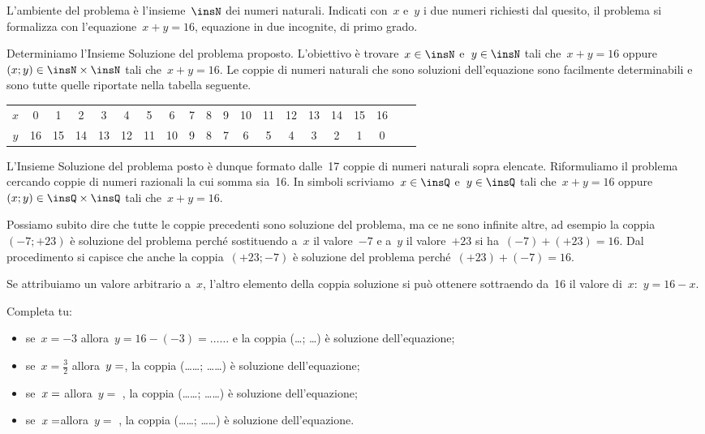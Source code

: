 \begin{soluzione}
L'ambiente del problema è l'insieme~$\insN$ dei numeri naturali. Indicati 
con~$x$ e~$y$ i due numeri
richiesti dal quesito, il problema si formalizza con l'equazione~$x+y=16$, 
equazione in due incognite, di
primo grado.

Determiniamo l'Insieme Soluzione del problema proposto.
L'obiettivo è trovare~$x\in\insN$ e~$y\in\insN$ tali che~$x+y=16$ 
oppure~$(x;y)\in\insN\times\insN$ tali che~$x+y=16$.
Le coppie di numeri naturali che sono soluzioni
dell'equazione sono facilmente determinabili e sono
tutte quelle riportate nella tabella seguente.

\begin{tabular}{cccccccccccccccccccc}
\toprule
$x$ & 0 & 1 & 2 & 3 & 4 & 5 & 6 & 7 & 8 & 9 & 10 & 11 & 12 & 13 & 14 & 15 & 16\\
$y$ & 16 & 15 & 14 & 13 & 12 & 11 & 10 & 9 & 8 & 7 & 6 & 5 & 4 & 3 & 2 & 1 & 0\\
\bottomrule
\end{tabular}

L'Insieme Soluzione del problema posto è dunque
formato dalle~17 coppie di numeri naturali sopra elencate.
Riformuliamo il problema cercando coppie di numeri razionali la cui
somma sia~16.
In simboli scriviamo~$x\in\insQ$ e~$y\in\insQ$ tali che~$x+y=16$ 
oppure~$(x;y)\in\insQ\times\insQ$ tali che~$x+y=16$.

Possiamo subito dire che tutte le coppie precedenti sono soluzione del
problema, ma ce ne sono infinite altre, ad esempio la coppia~$(-7;+23)$ è 
soluzione del problema perché sostituendo a~$x$ il
valore~$-7$ e a~$y$ il valore~$+23$ si ha~$(-7)+(+23)=16$.
Dal procedimento si capisce che anche la coppia~$(+23;-7)$ è
soluzione del problema perché~$(+23)+(-7)=16$.

Se attribuiamo un valore arbitrario a~$x$, l'altro
elemento della coppia soluzione si può ottenere sottraendo da~16 il
valore di~$x$:~$y=16-x$.

Completa tu:

\begin{itemize}
\item se~$x=-3$ allora~$y=16-(-3)=\ldots\ldots$ e la coppia (\ldots; \ldots) è 
soluzione dell'equazione;
\item se~$x=\frac{3}{2}$ allora~$y =\dotfill$, la coppia (\ldots\ldots; 
\ldots\ldots) è soluzione dell'equazione;
\item se~$x =\dotfill$ allora~$y=$ \dotfill, la coppia (\ldots\ldots; 
\ldots\ldots) è soluzione dell'equazione;
\item se~$x=\dotfill$allora~$y =$ \dotfill, la coppia (\ldots\ldots; 
\ldots\ldots) è soluzione dell'equazione.
\end{itemize}


\end{soluzione}
